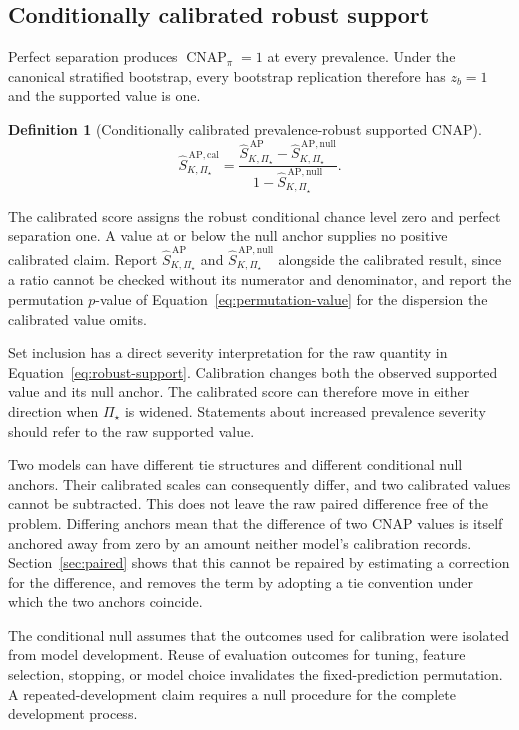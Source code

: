 \documentclass[11pt]{article}
\newcommand{\CNAP}{\operatorname{CNAP}}
\newcommand{\PSet}{\Pi_\star}
\newcommand{\SRobHat}{\widehat S_{K,\PSet}^{\,\mathrm{AP}}}
\newcommand{\SRobNullHat}{\widehat S_{K,\PSet}^{\,\mathrm{AP,null}}}
\newcommand{\SRobCalHat}{\widehat S_{K,\PSet}^{\,\mathrm{AP,cal}}}
\newtheorem{definition}{Definition}
\theoremstyle{remark}
\begin{document}
\subsection{Conditionally calibrated robust support}
\label{sec:calibration-def}

Perfect separation produces $\CNAP_\pi=1$ at every prevalence. Under the canonical stratified bootstrap, every bootstrap replication therefore has $z_b=1$ and the supported value is one.

\begin{definition}[Conditionally calibrated prevalence-robust supported CNAP]
\begin{equation}
\SRobCalHat
=
\frac{
\SRobHat-\SRobNullHat
}{
1-\SRobNullHat
}.
\label{eq:robust-calibration}
\end{equation}
\end{definition}

The calibrated score assigns the robust conditional chance level zero and perfect separation one. A value at or below the null anchor supplies no positive calibrated claim. Report $\SRobHat$ and $\SRobNullHat$ alongside the calibrated result, since a ratio cannot be checked without its numerator and denominator, and report the permutation $p$-value of Equation~\eqref{eq:permutation-value} for the dispersion the calibrated value omits.

Set inclusion has a direct severity interpretation for the raw quantity in Equation~\eqref{eq:robust-support}. Calibration changes both the observed supported value and its null anchor. The calibrated score can therefore move in either direction when $\PSet$ is widened. Statements about increased prevalence severity should refer to the raw supported value.

Two models can have different tie structures and different conditional null anchors. Their calibrated scales can consequently differ, and two calibrated values cannot be subtracted. This does not leave the raw paired difference free of the problem. Differing anchors mean that the difference of two CNAP values is itself anchored away from zero by an amount neither model's calibration records. Section~\ref{sec:paired} shows that this cannot be repaired by estimating a correction for the difference, and removes the term by adopting a tie convention under which the two anchors coincide.

The conditional null assumes that the outcomes used for calibration were isolated from model development. Reuse of evaluation outcomes for tuning, feature selection, stopping, or model choice invalidates the fixed-prediction permutation. A repeated-development claim requires a null procedure for the complete development process.
\end{document}
